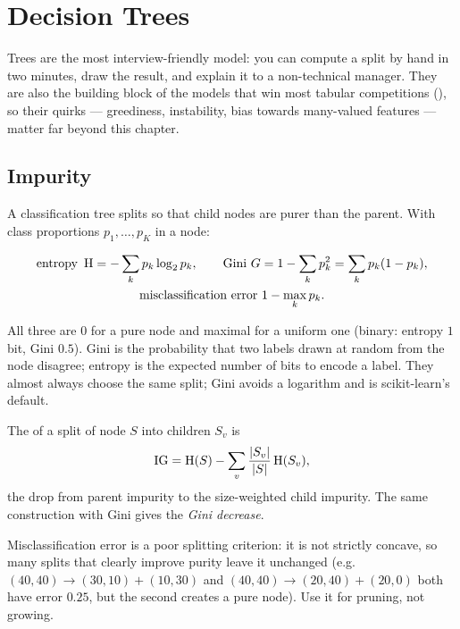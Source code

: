 \chapter{Decision Trees}
\label{ch:trees}
Trees are the most interview-friendly model: you can compute a split by hand in two minutes, draw
the result, and explain it to a non-technical manager. They are also the building block of the
models that win most tabular competitions (), so their quirks --- greediness,
instability, bias towards many-valued features --- matter far beyond this chapter.

\section{Impurity}

A classification tree splits so that child nodes are purer than the parent. With class proportions
$p_1,\dots,p_K$ in a node:
\begin{definition}
	\begin{gather*}
		\text{entropy } \operatorname{H}=-\sum_kp_k\log_2p_k,\qquad
		\text{Gini } G=1-\sum_kp_k^2=\sum_kp_k(1-p_k),\\
		\text{misclassification error } 1-\max_kp_k.
	\end{gather*}
\end{definition}
All three are $0$ for a pure node and maximal for a uniform one (binary: entropy $1$ bit, Gini
$0.5$). Gini is the probability that two labels drawn at random from the node disagree; entropy is
the expected number of bits to encode a label. They almost always choose the same split; Gini avoids
a logarithm and is scikit-learn's default.

\begin{definition}
	The  of a split of node $S$ into children $S_v$ is
	\[ \operatorname{IG}=\operatorname{H}(S)-\sum_v\frac{\left\lvert S_v \right\rvert}{\left\lvert S \right\rvert}\operatorname{H}(S_v), \]
	the drop from parent impurity to the size-weighted child impurity. The same construction with
	Gini gives the \emph{Gini decrease}.
\end{definition}

\begin{remark}
	\trap Misclassification error is a poor splitting criterion: it is not strictly concave, so many
	splits that clearly improve purity leave it unchanged (e.g.\ $(40,40)\to(30,10)+(10,30)$ and
	$(40,40)\to(20,40)+(20,0)$ both have error $0.25$, but the second creates a pure node). Use it for
	pruning, not growing.
\end{remark}

